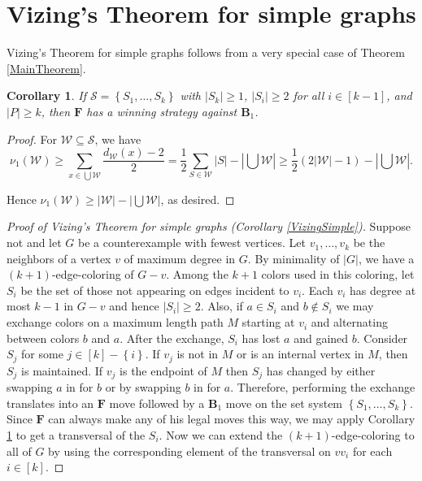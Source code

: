 \documentclass[12pt]{amsart}
\theoremstyle{plain}
\newtheorem{cor}[thm]{Corollary}
\theoremstyle{definition}
\theoremstyle{remark}
\newcommand{\fancy}[1]{\mathcal{#1}}
\newcommand{\set}[1]{\left\{ #1 \right\}}
\newcommand{\card}[1]{\left|#1\right|}
\newcommand{\irange}[1]{\left[#1\right]}
\renewcommand{\S}{\fancy{S}}
\newcommand{\W}{\fancy{W}}
\newcommand{\F}{\mathbf{F}}
\newcommand{\B}{\mathbf{B}}
\begin{document}
\section{Vizing's Theorem for simple graphs}\label{VizingSection}
\noindent Vizing's Theorem for simple graphs follows from a very special case of Theorem
\ref{MainTheorem}.

\begin{cor}\label{Simple}
If $\S = \set{S_1, \ldots, S_k}$ with $\card{S_k} \geq 1$, $\card{S_i} \ge
2$ for all $i \in \irange{k-1}$, and $|P| \ge k$, then $\F$ has a winning strategy against
$\B_1$.
\end{cor}

\begin{proof}
For $\W \subseteq \S$, we have 
\[\nu_1(\W) \geq \sum_{x
\in \bigcup \W} \frac{d_{\W}(x) - 2}{2} = \frac12 \sum_{S \in \W} \card{S} -
\card{\bigcup \W} \geq \frac12 (2\card{\W} - 1) -
\card{\bigcup \W}.\]  

\noindent Hence $\nu_1(\W) \geq \card{\W} - \card{\bigcup \W}$, as desired.
\end{proof}

\bigskip

\begin{proof}[Proof of Vizing's Theorem for simple graphs (Corollary \ref{VizingSimple})]
Suppose not and let $G$ be a counterexample with fewest vertices.
Let $v_1, \ldots, v_k$ be the neighbors of a vertex $v$ of maximum degree in $G$. 
By minimality of $\card{G}$, we have a $(k + 1)$-edge-coloring of $G -
v$. Among the $k+1$ colors used in this coloring, let $S_i$ be the set of those not appearing on edges incident to $v_i$.
Each $v_i$ has degree at most $k - 1$ in $G - v$ and hence
$\card{S_i} \geq 2$. Also, if $a \in S_i$ and $b \not \in S_i$ we
may exchange colors on a maximum length path $M$ starting at $v_i$ and alternating between colors $b$ and $a$. 
After the exchange, $S_i$ has lost $a$ and gained $b$.  Consider $S_j$ for some $j \in \irange{k} - \set{i}$.
If $v_j$ is not in $M$ or is an internal vertex in $M$, then $S_j$ is maintained.  If $v_j$ is the endpoint of $M$
then $S_j$ has changed by either swapping $a$ in for $b$ or by swapping $b$ in for $a$.  Therefore, performing the exchange 
translates into an $\F$ move followed by a $\B_1$ move on the set system $\set{S_1, \ldots, S_k}$.  Since $\F$ can always make any of his legal moves this way, we may apply Corollary \ref{Simple}
to get a transversal of the $S_i$. Now we can extend the $(k + 1)$-edge-coloring to all of $G$ by using the corresponding element of the
transversal on $vv_i$ for each $i \in \irange{k}$.
\end{proof}
\end{document}
